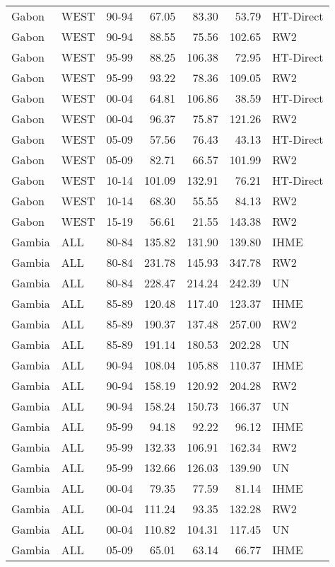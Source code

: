 \begin{longtable}{lllrrrl}
  Gabon & WEST & 90-94 & 67.05 & 83.30 & 53.79 & HT-Direct \\ 
  Gabon & WEST & 90-94 & 88.55 & 75.56 & 102.65 & RW2 \\ 
  Gabon & WEST & 95-99 & 88.25 & 106.38 & 72.95 & HT-Direct \\ 
  Gabon & WEST & 95-99 & 93.22 & 78.36 & 109.05 & RW2 \\ 
  Gabon & WEST & 00-04 & 64.81 & 106.86 & 38.59 & HT-Direct \\ 
  Gabon & WEST & 00-04 & 96.37 & 75.87 & 121.26 & RW2 \\ 
  Gabon & WEST & 05-09 & 57.56 & 76.43 & 43.13 & HT-Direct \\ 
  Gabon & WEST & 05-09 & 82.71 & 66.57 & 101.99 & RW2 \\ 
  Gabon & WEST & 10-14 & 101.09 & 132.91 & 76.21 & HT-Direct \\ 
  Gabon & WEST & 10-14 & 68.30 & 55.55 & 84.13 & RW2 \\ 
  Gabon & WEST & 15-19 & 56.61 & 21.55 & 143.38 & RW2 \\ 
  Gambia & ALL & 80-84 & 135.82 & 131.90 & 139.80 & IHME \\ 
  Gambia & ALL & 80-84 & 231.78 & 145.93 & 347.78 & RW2 \\ 
  Gambia & ALL & 80-84 & 228.47 & 214.24 & 242.39 & UN \\ 
  Gambia & ALL & 85-89 & 120.48 & 117.40 & 123.37 & IHME \\ 
  Gambia & ALL & 85-89 & 190.37 & 137.48 & 257.00 & RW2 \\ 
  Gambia & ALL & 85-89 & 191.14 & 180.53 & 202.28 & UN \\ 
  Gambia & ALL & 90-94 & 108.04 & 105.88 & 110.37 & IHME \\ 
  Gambia & ALL & 90-94 & 158.19 & 120.92 & 204.28 & RW2 \\ 
  Gambia & ALL & 90-94 & 158.24 & 150.73 & 166.37 & UN \\ 
  Gambia & ALL & 95-99 & 94.18 & 92.22 & 96.12 & IHME \\ 
  Gambia & ALL & 95-99 & 132.33 & 106.91 & 162.34 & RW2 \\ 
  Gambia & ALL & 95-99 & 132.66 & 126.03 & 139.90 & UN \\ 
  Gambia & ALL & 00-04 & 79.35 & 77.59 & 81.14 & IHME \\ 
  Gambia & ALL & 00-04 & 111.24 & 93.35 & 132.28 & RW2 \\ 
  Gambia & ALL & 00-04 & 110.82 & 104.31 & 117.45 & UN \\ 
  Gambia & ALL & 05-09 & 65.01 & 63.14 & 66.77 & IHME \\ 

\end{longtable}
